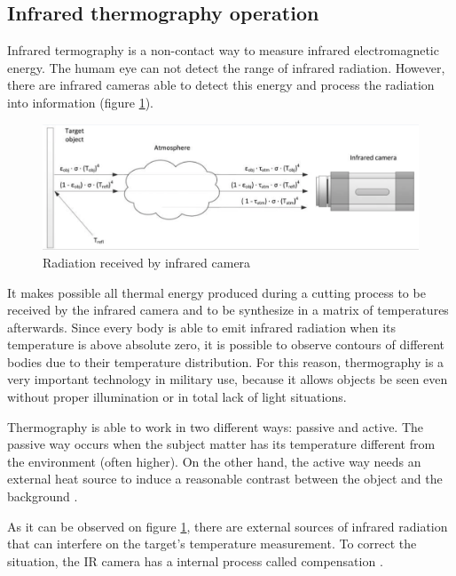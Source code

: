 	\subsection{Infrared thermography operation}

	Infrared termography is a non-contact way to measure infrared electromagnetic energy. The humam eye can not detect the range of infrared radiation. However, there are infrared cameras able to detect this energy and process the radiation into information (figure \ref{fig:thermog}).

	\begin{figure}[H]
		\centering
		\captionsetup{justification=centering}
		\includegraphics[scale=0.5]{Imagens/thermography.png}
		\caption{Radiation received by infrared camera \cite{usamentiaga2014}}
		\label{fig:thermog}
	\end{figure}

	It makes possible all thermal energy produced during a cutting process to be received by the infrared camera and to be synthesize in a matrix of temperatures afterwards. Since every body is able to emit infrared radiation when its temperature is above absolute zero, it is possible to observe contours of different bodies due to their temperature distribution. For this reason, thermography is a very important technology in military use, because it allows objects be seen even without proper illumination or in total lack of light situations.

	Thermography is able to work in two different ways: passive and active. The passive way occurs when the subject matter has its temperature different from the environment (often higher). On the other hand, the active way needs an external heat source to induce a reasonable contrast between the object and the background \cite{maldague2000}.

	As it can be observed on figure \ref{fig:thermog}, there are external sources of infrared radiation that can interfere on the target's temperature measurement. To correct the situation, the IR camera has a internal process called compensation \cite{usamentiaga2014}.

